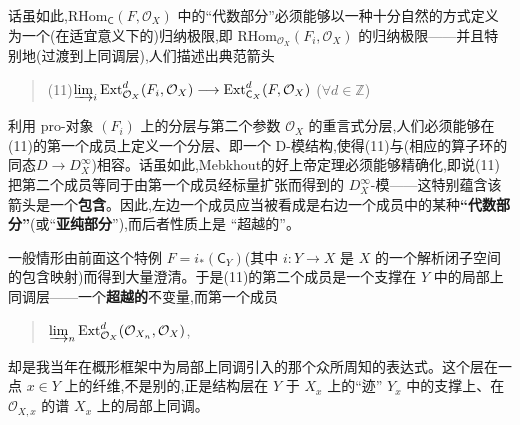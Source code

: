 \noindent 话虽如此,$\mathrm{RHom}_{\mathsf{C}}(F,\mathcal{O}_{X})$ 中的“代数部分”必须能够以一种十分自然的方式定义为一个(在适宜意义下的)归纳极限,即 $\mathrm{RHom}_{\mathcal{O}_{X}}(F_{i},\mathcal{O}_{X})$ 的归纳极限——并且特别地(过渡到上同调层),人们描述出典范箭头
\begin{quote}
(11)\quad $\varinjlim_{i}\mathrm{Ext}^{d}_{\mathcal{O}_{X}}(F_{i},\mathcal{O}_{X})\longrightarrow\mathrm{Ext}^{d}_{\mathsf{C}_{X}}(F,\mathcal{O}_{X})$ \quad ($\forall d\in\mathbb{Z}$)
\end{quote}
利用 pro-对象 $(F_{i})$ 上的分层与第二个参数 $\mathcal{O}_{X}$ 的重言式分层\dmark{},人们必须能够在(11)的第一个成员上定义一个分层、即一个 D-模结构,使得(11)与(相应的算子环的同态$D\to D^{\infty}_{X}$)相容。话虽如此,Mebkhout的好上帝定理必须能够精确化,即说(11)把第二个成员等同于由第一个成员经标量扩张而得到的 $D^{\infty}_{X}$-模——这特别蕴含该箭头是一个\textbf{包含}。因此,左边一个成员应当被看成是右边一个成员中的某种\textbf{“代数部分”}(或“\textbf{亚纯部分}”),而后者性质上是
“超越的”。

\noindent 一般情形由前面这个特例 $F=i_{*}(\mathsf{C}_{Y})$(其中 $i : Y\to X$ 是 $X$ 的一个解析闭子空间的包含映射)而得到大量澄清。于是(11)的第二个成员是一个支撑在 $Y$ 中的局部上同调层——一个\textbf{超越的}不变量,而第一个成员
\begin{quote}
$\varinjlim_{n}\mathrm{Ext}^{d}_{\mathcal{O}_{X}}(\mathcal{O}_{X_{n}},\mathcal{O}_{X})$,
\end{quote}
却是我当年在概形框架中为局部上同调引入的那个众所周知的表达式。这个层在一点 $x\in Y$ 上的纤维,不是别的,正是结构层在 $Y$ 于 $X_{x}$ 上的“迹” $Y_{x}$ 中的支撑上、在 $\mathcal{O}_{X,x}$ 的谱 $X_{x}$ 上的局部上同调。

